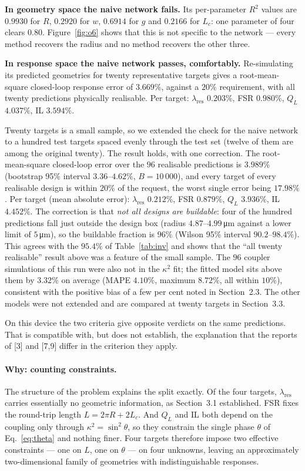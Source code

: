 \documentclass[11pt]{article}
\newcommand{\lres}{\lambda_{\mathrm{res}}}
\newcommand{\QL}{Q_L}
\begin{document}
\textbf{In geometry space the naive network fails.} Its per-parameter $R^2$
values are $0.9930$ for $R$, $0.2920$ for $w$, $0.6914$ for $g$ and $0.2166$
for $L_c$: one parameter of four clears $0.80$. Figure~\ref{fig:o6} shows
that this is not specific to the network --- every method recovers the radius
and no method recovers the other three.

\textbf{In response space the naive network passes, comfortably.} Re-simulating
its predicted geometries for twenty representative targets gives a
root-mean-square closed-loop response error of $3.669\%$, against a $20\%$
requirement, with all twenty predictions physically realisable. Per target:
$\lres$ $0.203\%$, FSR $0.980\%$, $\QL$ $4.037\%$, IL $3.594\%$.

Twenty targets is a small sample, so we extended the check for the naive network
to a hundred test targets spaced evenly through the test set (twelve of them are
among the original twenty). The result holds, with one correction. The
root-mean-square closed-loop error over the $96$ realisable predictions is
$3.989\%$ (bootstrap 95\% interval $3.36$--$4.62\%$, $B = 10\,000$), and every
target of every realisable design is within $20\%$ of the request, the worst
single error being $17.98\%$. Per target (mean absolute error): $\lres$
$0.212\%$, FSR $0.879\%$, $\QL$ $3.936\%$, IL $4.452\%$. The correction is that
\emph{not all designs are buildable}: four of the hundred predictions fall just
outside the design box (radius $4.87$--$4.99$\,\si{\micro\metre} against a lower
limit of $5$\,\si{\micro\metre}), so the buildable fraction is $96\%$ (Wilson 95\%
interval $90.2$--$98.4\%$). This agrees with the $95.4\%$ of Table~\ref{tab:inv}
and shows that the ``all twenty realisable'' result above was a feature of the small sample.
The $96$ coupler simulations of this run were also not in the $\kappa^2$ fit; the fitted model
sits above them by $3.32\%$ on average (MAPE $4.10\%$, maximum $8.72\%$, all within
$10\%$), consistent with the positive bias of a few per cent noted in Section~2.3.
The other models were not extended and are compared at twenty targets in Section~3.3.

On this device the two criteria give opposite verdicts on the same predictions. That is compatible with, but does not establish, the explanation that the reports of [3] and [7,9] differ in the criterion they apply.

\paragraph{Why: counting constraints.} The structure of the problem explains
the split exactly. Of the four targets, $\lres$ carries essentially no
geometric information, as Section~3.1 established. FSR fixes the round-trip
length $L = 2\pi R + 2L_c$. And $\QL$ and IL both depend on the coupling only
through $\kappa^2 = \sin^2\theta$, so they constrain the single phase $\theta$
of Eq.~\eqref{eq:theta} and nothing finer. Four targets therefore impose two
effective constraints --- one on $L$, one on $\theta$ --- on four unknowns,
leaving an approximately two-dimensional family of geometries with indistinguishable
responses.
\end{document}
